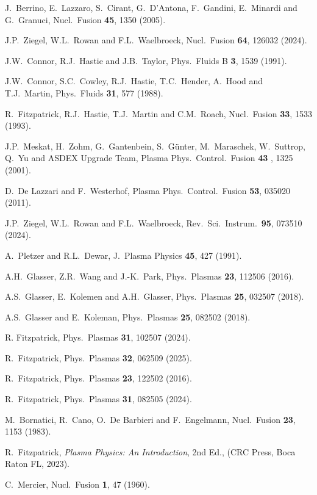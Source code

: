 \documentclass{iopjournal}
\begin{document}
{\begin{thebibliography}{99}
 J.~Berrino, E.~Lazzaro, S.~Cirant, G.~D'Antona, F.~Gandini, E.~Minardi and G.~Granuci, Nucl.\ Fusion {\bf 45}, 1350 (2005).

 J.P.~Ziegel, W.L.~Rowan and F.L.~Waelbroeck, Nucl.\ Fusion {\bf 64}, 126032 (2024).

 J.W.~Connor, R.J.~Hastie and J.B.~Taylor, Phys.\ Fluids B {\bf 3}, 1539 (1991).

 J.W.~Connor,  S.C.~Cowley, R.J.~Hastie,  T.C.~Hender,  A.~Hood  and T.J.~Martin,  Phys.\ Fluids {\bf 31}, 577 (1988).

 R.~Fitzpatrick, R.J.~Hastie, T.J.~Martin and C.M.~Roach, Nucl.\ Fusion {\bf 33}, 1533 (1993).

 J.P.~Meskat, H.~Zohm, G.~Gantenbein, S.~G\"{u}nter, M.~Maraschek, W.~Suttrop, Q.~Yu and ASDEX Upgrade Team, Plasma Phys.\ Control.\ Fusion {\bf 43} , 1325 (2001).

 D.~De Lazzari and F.~Westerhof, Plasma Phys.\ Control.\ Fusion {\bf 53}, 035020 (2011).

 J.P.~Ziegel, W.L.~Rowan and F.L.~Waelbroeck, Rev.\ Sci.\ Instrum.\ {\bf 95}, 073510 (2024).

 A.~Pletzer and R.L.~Dewar, J.\ Plasma Physics {\bf 45}, 427 (1991).

 A.H.~Glasser, Z.R.~Wang and J.-K.~Park, Phys.\ Plasmas {\bf 23}, 112506 (2016).

 A.S.~Glasser, E.~Kolemen and A.H.~Glasser, Phys.\ Plasmas {\bf 25}, 032507 (2018).

 A.S.~Glasser and E.~Koleman, Phys.\ Plasmas {\bf 25}, 082502 (2018). 

 R. Fitzpatrick, Phys.\ Plasmas {\bf 31}, 102507 (2024).

 R.~Fitzpatrick,  Phys.\ Plasmas {\bf 32}, 062509 (2025).

 R.~Fitzpatrick, Phys.\ Plasmas {\bf 23}, 122502 (2016).

 R.~Fitzpatrick, Phys.\ Plasmas {\bf 31}, 082505 (2024).

 M.~Bornatici, R.~Cano, O.\ De Barbieri and F.~Engelmann, Nucl.\ Fusion {\bf 23}, 1153 (1983).

 R.~Fitzpatrick, {\em Plasma Physics: An Introduction}, 2nd Ed., (CRC Press, Boca Raton FL, 2023).

 C.~Mercier, Nucl.\ Fusion {\bf 1}, 47 (1960).


\end{thebibliography}}
\end{document}
